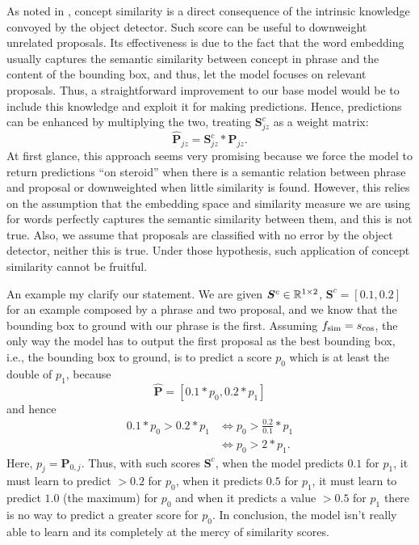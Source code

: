 As noted in \cite{chen2018knowledge}, concept similarity is a direct
consequence of the intrinsic knowledge convoyed by the object
detector. Such score can be useful to downweight unrelated proposals.
Its effectiveness is due to the fact that the word embedding usually
captures the semantic similarity between concept in phrase and the
content of the bounding box, and thus, let the model focuses on
relevant proposals. Thus, a straightforward improvement to our base
model would be to include this knowledge and exploit it for making
predictions. Hence, predictions can be enhanced by multiplying the
two, treating $\bm{S}^c_{jz}$ as a weight matrix:
\begin{equation}
  \bm{\hat{P}}_{jz} = \bm{S}^c_{jz} * \bm{P}_{jz}.
\end{equation}
At first glance, this approach seems very promising because we force
the model to return predictions ``on steroid'' when there is a
semantic relation between phrase and proposal or downweighted when
little similarity is found. However, this relies on the assumption
that the embedding space and similarity measure we are using for words
perfectly captures the semantic similarity between them, and this is
not true. Also, we assume that proposals are classified with no error
by the object detector, neither this is true. Under those hypothesis,
such application of concept similarity cannot be fruitful. 

An example my clarify our statement.  We are given $\bm{S}^c \in
\mathbb{R}^{1 \times 2}$, $\bm{S}^c = [0.1, 0.2]$ for an example composed
by a phrase and two proposal, and we know that the bounding box to
ground with our phrase is the first. Assuming $f_{\text{sim}} = s_{\cos}$,
the only way the model has to output the first proposal as the best
bounding box, i.e., the bounding box to ground, is to predict a score
$p_{0}$ which is at least the double of $p_{1}$, because
\begin{equation}
  \bm{\hat{P}} = [0.1 * p_{0}, 0.2 * p_{1}]
\end{equation}
and hence
\begin{equation}
\begin{split}
0.1 * p_{0} > 0.2 * p_{1} & \iff p_{0} >  \frac{0.2}{0.1} * p_{1} \\
  & \iff p_{0} > 2 * p_{1}.
\end{split}
\end{equation}
Here, $p_{j} = \bm{P}_{0,j}$. Thus, with such scores $\bm{S}^c$, when
the model predicts $0.1$ for $p_1$, it must learn to predict $> 0.2$
for $p_0$, when it predicts $0.5$ for $p_1$, it must learn to predict
$1.0$ (the maximum) for $p_0$ and when it predicts a value $> 0.5$ for
$p_1$ there is no way to predict a greater score for $p_0$. In
conclusion, the model isn't really able to learn and its completely at
the mercy of similarity scores.

